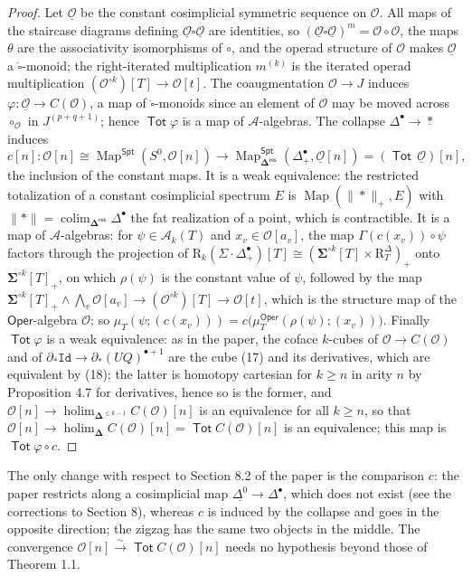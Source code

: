 \documentclass[12pt]{article}
\theoremstyle{plain}
\theoremstyle{definition}
\theoremstyle{remark}
\newcommand{\Cal}[1]{\mathcal{#1}}
\newcommand{\Id}{\mathtt{Id}}
\newcommand{\Tot}{\operatorname{\mathsf{Tot}}}
\newcommand{\holim}{\operatorname{holim}}
\newcommand{\Oper}{\mathsf{Oper}}
\newcommand{\bdel}{\mathbf{\Delta}}
\newcommand{\Dres}{\bdel^{\mathsf{res}}}
\newcommand{\boxcirc}{\mathring{\square}}
\newcommand{\SD}{\Sigma{\cdot}\Delta^{\bullet}}
\newcommand{\pt}{*}
\newcommand{\Spt}{\mathsf{Spt}}
\newcommand{\Map}{\operatorname{Map}}
\newcommand{\Rr}{\mathrm{R}}
\begin{document}
\begin{proof}
Let $\underline{\Cal O}$ be the constant cosimplicial symmetric sequence on $\Cal O$. All maps of the staircase diagrams defining $\underline{\Cal O}\boxcirc\underline{\Cal O}$ are identities, so $(\underline{\Cal O}\boxcirc\underline{\Cal O})^m=\Cal O\circ\Cal O$, the maps $\theta$ are the associativity isomorphisms of $\circ$, and the operad structure of $\Cal O$ makes $\underline{\Cal O}$ a $\boxcirc$-monoid; the right-iterated multiplication $m^{(k)}$ is the iterated operad multiplication $(\Cal O^{\circ k})[T]\to\Cal O[t]$. The coaugmentation $\Cal O\to J$ induces $\varphi\colon\underline{\Cal O}\to C(\Cal O)$, a map of $\boxcirc$-monoids since an element of $\Cal O$ may be moved across $\circ_{\Cal O}$ in $J^{(p+q+1)}$; hence $\Tot\varphi$ is a map of $\Cal A$-algebras. The collapse $\Delta^\bullet\to\underline\pt$ induces
\[c[n]\colon\Cal O[n]\cong\Map^{\Spt}(S^0,\Cal O[n])\longrightarrow\Map^{\Spt}_{\Dres}(\Delta^\bullet_+,\underline{\Cal O}[n])=(\Tot\,\underline{\Cal O})[n],\]
the inclusion of the constant maps. It is a weak equivalence: the restricted totalization of a constant cosimplicial spectrum $E$ is $\Map(\|\pt\|_+,E)$ with $\|\pt\|=\operatorname{colim}_{\Dres}\Delta^\bullet$ the fat realization of a point, which is contractible. It is a map of $\Cal A$-algebras: for $\psi\in\Cal A_k(T)$ and $x_v\in\Cal O[a_v]$, the map $\Gamma(c(x_v))\circ\psi$ factors through the projection of $\Rr_k(\SD_+)[T]\cong(\mathbf\Sigma^{\circ k}[T]\times\Rr^\Delta_T)_+$ onto $\mathbf\Sigma^{\circ k}[T]_+$, on which $\rho(\psi)$ is the constant value of $\psi$, followed by the map $\mathbf\Sigma^{\circ k}[T]_+\wedge\bigwedge_v\Cal O[a_v]\to(\Cal O^{\circ k})[T]\to\Cal O[t]$, which is the structure map of the $\Oper$-algebra $\Cal O$; so $\mu_T(\psi;(c(x_v)))=c\big(\mu^{\Oper}_T(\rho(\psi);(x_v))\big)$. Finally $\Tot\varphi$ is a weak equivalence: as in the paper, the coface $k$-cubes of $\Cal O\to C(\Cal O)$ and of $\partial_*\Id\to\partial_*(UQ)^{\bullet+1}$ are the cube (17) and its derivatives, which are equivalent by (18); the latter is homotopy cartesian for $k\geq n$ in arity $n$ by Proposition 4.7 for derivatives, hence so is the former, and $\Cal O[n]\to\holim_{\bdel^{\leq k-1}}C(\Cal O)[n]$ is an equivalence for all $k\geq n$, so that $\Cal O[n]\to\holim_{\bdel}C(\Cal O)[n]=\Tot C(\Cal O)[n]$ is an equivalence; this map is $\Tot\varphi\circ c$.
\end{proof}

The only change with respect to Section 8.2 of the paper is the comparison $c$: the paper restricts along a cosimplicial map $\underline{\Delta^0}\to\Delta^\bullet$, which does not exist (see the corrections to Section 8), whereas $c$ is induced by the collapse and goes in the opposite direction; the zigzag has the same two objects in the middle. The convergence $\Cal O[n]\xrightarrow{\sim}\Tot C(\Cal O)[n]$ needs no hypothesis beyond those of Theorem 1.1.
\end{document}
